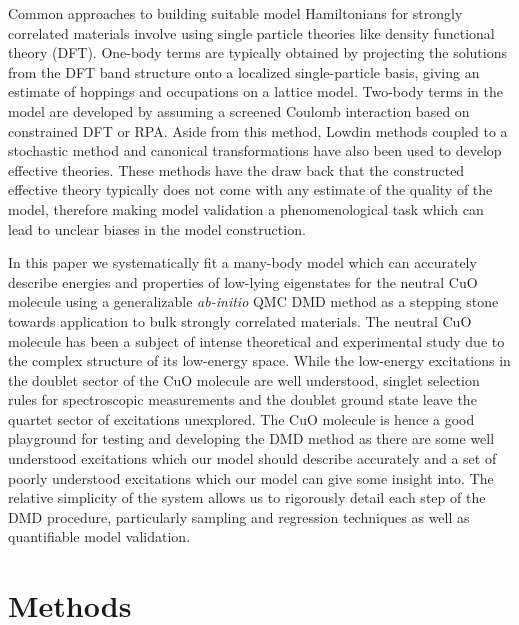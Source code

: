 \documentclass{article}
\begin{document}
Common approaches to building suitable model Hamiltonians for strongly correlated materials involve using single particle theories like density functional theory (DFT).
One-body terms are typically obtained by projecting the solutions from the DFT band structure onto a localized single-particle basis, giving an estimate of hoppings and occupations on a lattice model.
Two-body terms in the model are developed by assuming a screened Coulomb interaction based on constrained DFT or RPA.
Aside from this method, Lowdin methods coupled to a stochastic method and canonical transformations have also been used to develop effective theories.
These methods have the draw back that the constructed effective theory typically does not come with any estimate of the quality of the model, therefore making model validation a phenomenological task which can lead to unclear biases in the model construction.

In this paper we systematically fit a many-body model
which can accurately describe energies and properties of low-lying eigenstates for the neutral CuO molecule using a generalizable \textit{ab-initio} QMC DMD method as a stepping stone towards application to bulk strongly correlated materials.
The neutral CuO molecule has been a subject of intense theoretical and experimental study due to the complex structure of its low-energy space.
While the low-energy excitations in the doublet sector of the CuO molecule are well understood, singlet selection rules for spectroscopic measurements and the doublet ground state leave the quartet sector of excitations unexplored.
The CuO molecule is hence a good playground for testing and developing the DMD method as there are some well understood excitations which our model should describe accurately and a set of poorly understood excitations which our model can give some insight into.
The relative simplicity of the system allows us to rigorously detail each step of the DMD procedure, particularly sampling and regression techniques as well as quantifiable model validation.

\section{Methods}
\end{document}

